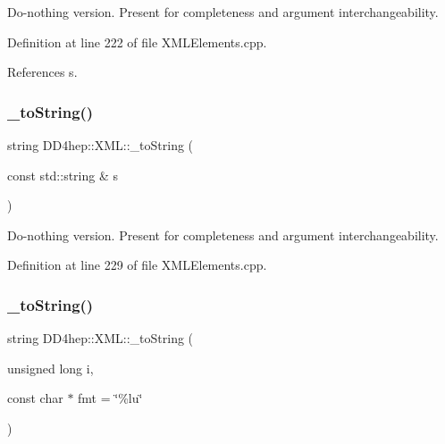 Do-\/nothing version. Present for completeness and argument interchangeability. 



Definition at line 222 of file X\+M\+L\+Elements.\+cpp.



References s.

\hypertarget{group___d_d4_h_e_p___x_m_l_ga3cc667e7ad6da9a55052498695c44e27}{}\label{group___d_d4_h_e_p___x_m_l_ga3cc667e7ad6da9a55052498695c44e27} 
\subsubsection{\texorpdfstring{\+\_\+to\+String()}{\_toString()}\hspace{0.1cm}{\footnotesize\ttfamily [4/12]}}
{\footnotesize\ttfamily string D\+D4hep\+::\+X\+M\+L\+::\+\_\+to\+String (\begin{DoxyParamCaption}\item[{const std\+::string \&}]{s }\end{DoxyParamCaption})}



Do-\/nothing version. Present for completeness and argument interchangeability. 



Definition at line 229 of file X\+M\+L\+Elements.\+cpp.

\hypertarget{group___d_d4_h_e_p___x_m_l_ga52447f7eb531c40682ba02c1271c1030}{}\label{group___d_d4_h_e_p___x_m_l_ga52447f7eb531c40682ba02c1271c1030} 
\subsubsection{\texorpdfstring{\+\_\+to\+String()}{\_toString()}\hspace{0.1cm}{\footnotesize\ttfamily [5/12]}}
{\footnotesize\ttfamily string D\+D4hep\+::\+X\+M\+L\+::\+\_\+to\+String (\begin{DoxyParamCaption}\item[{unsigned long}]{i,  }\item[{const char $\ast$}]{fmt = {\ttfamily \char`\"{}\%lu\char`\"{}} }\end{DoxyParamCaption})}



